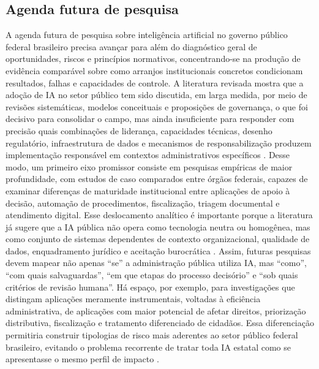 \documentclass[12pt,a4paper]{article}
\begin{document}
\subsection{Agenda futura de pesquisa}
\label{sec:org0227407}
A agenda futura de pesquisa sobre inteligência artificial no governo público federal brasileiro precisa avançar para além do diagnóstico geral de oportunidades, riscos e princípios normativos, concentrando-se na produção de evidência comparável sobre como arranjos institucionais concretos condicionam resultados, falhas e capacidades de controle. A literatura revisada mostra que a adoção de IA no setor público tem sido discutida, em larga medida, por meio de revisões sistemáticas, modelos conceituais e proposições de governança, o que foi decisivo para consolidar o campo, mas ainda insuficiente para responder com precisão quais combinações de liderança, capacidades técnicas, desenho regulatório, infraestrutura de dados e mecanismos de responsabilização produzem implementação responsável em contextos administrativos específicos \autocite{madan2022ai} \autocite{serra2024a} \autocite{criado2024artificial}. Desse modo, um primeiro eixo promissor consiste em pesquisas empíricas de maior profundidade, com estudos de caso comparados entre órgãos federais, capazes de examinar diferenças de maturidade institucional entre aplicações de apoio à decisão, automação de procedimentos, fiscalização, triagem documental e atendimento digital.
Esse deslocamento analítico é importante porque a literatura já sugere que a IA pública não opera como tecnologia neutra ou homogênea, mas como conjunto de sistemas dependentes de contexto organizacional, qualidade de dados, enquadramento jurídico e aceitação burocrática \autocite{parycek2023artificial} \autocite{pi2021machine}. Assim, futuras pesquisas devem mapear não apenas “se” a administração pública utiliza IA, mas “como”, “com quais salvaguardas”, “em que etapas do processo decisório” e “sob quais critérios de revisão humana”. Há espaço, por exemplo, para investigações que distingam aplicações meramente instrumentais, voltadas à eficiência administrativa, de aplicações com maior potencial de afetar direitos, priorização distributiva, fiscalização e tratamento diferenciado de cidadãos. Essa diferenciação permitiria construir tipologias de risco mais aderentes ao setor público federal brasileiro, evitando o problema recorrente de tratar toda IA estatal como se apresentasse o mesmo perfil de impacto \autocite{batool2025ai} \autocite{sigfrids2022how}.
\end{document}
